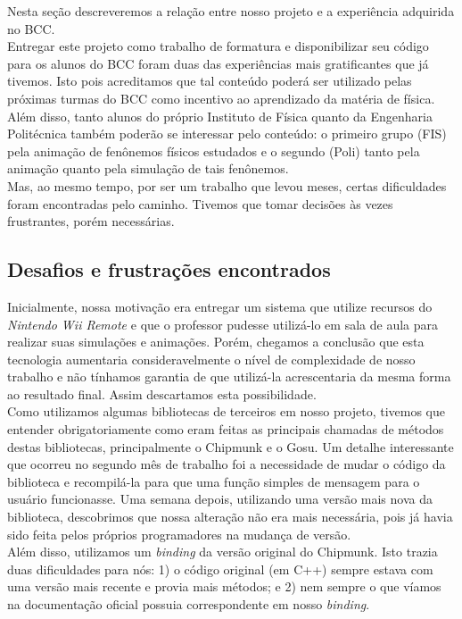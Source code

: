 Nesta seção descreveremos a relação entre nosso projeto e a experiência adquirida no BCC.\\ 

Entregar este projeto como trabalho de formatura e disponibilizar seu código para os alunos do BCC foram duas das experiências mais gratificantes que já tivemos. Isto pois acreditamos que tal conteúdo poderá ser utilizado pelas próximas turmas do BCC como incentivo ao aprendizado da matéria de física. Além disso, tanto alunos do próprio Instituto de Física quanto da Engenharia Politécnica também poderão se interessar pelo conteúdo: o primeiro grupo (FIS) pela animação de fenônemos físicos estudados e o segundo (Poli) tanto pela animação quanto pela simulação de tais fenônemos. \\

Mas, ao mesmo tempo, por ser um trabalho que levou meses, certas dificuldades foram encontradas pelo caminho. Tivemos que tomar decisões às vezes frustrantes, porém necessárias.\\

\subsection{Desafios e frustrações encontrados}
Inicialmente, nossa motivação era entregar um sistema que utilize recursos do \textit{Nintendo Wii Remote} \cite{wii} e que o professor pudesse utilizá-lo em sala de aula para realizar suas simulações e animações. Porém, chegamos a conclusão que esta tecnologia aumentaria consideravelmente o nível de complexidade de nosso trabalho e não tínhamos garantia de que utilizá-la acrescentaria da mesma forma ao resultado final. Assim descartamos esta possibilidade.\\

Como utilizamos algumas bibliotecas de terceiros em nosso projeto, tivemos que entender obrigatoriamente como eram feitas as principais chamadas de métodos destas bibliotecas, principalmente o Chipmunk e o Gosu. Um detalhe interessante que ocorreu no segundo mês de trabalho foi a necessidade de mudar o código da biblioteca e recompilá-la para que uma função simples de mensagem para o usuário funcionasse. Uma semana depois, utilizando uma versão mais nova da biblioteca, descobrimos que nossa alteração não era mais necessária, pois já havia sido feita pelos próprios programadores na mudança de versão.\\

Além disso, utilizamos um \textit{binding} da versão original do Chipmunk. Isto trazia duas dificuldades para nós: 1) o código original (em C++) sempre estava com uma versão mais recente e provia mais métodos; e 2) nem sempre o que víamos na documentação oficial possuia correspondente em nosso \textit{binding}. \\
 
